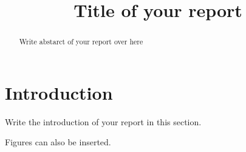 \documentclass[preprint,5p,times,twocolumn]{elsarticle}
\begin{document}
\begin{frontmatter}



\title{Title of your report}


\author{}

\address{}


\begin{abstract}
Write abstarct of your report over here
\end{abstract}

\begin{keyword}

\end{keyword}

\end{frontmatter}

\linenumbers

\section{Introduction}
 Write the introduction of your report in this section.
 
Figures can also be inserted.  
 
\end{document}
